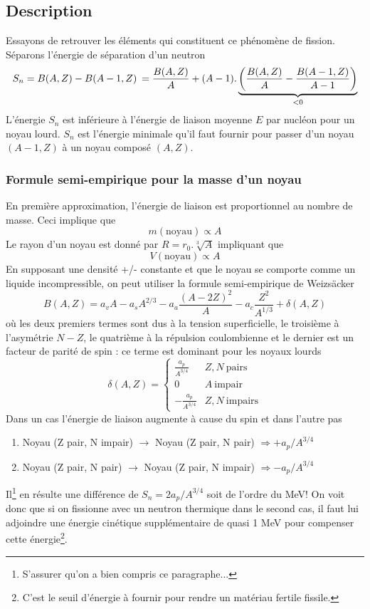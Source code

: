 \subsection{Description}
Essayons de retrouver les éléments qui constituent ce phénomène de fission. Séparons l'énergie de 
séparation d'un neutron
\begin{equation}
{S_n} = B(A,Z) - B(A - 1,Z)  {\kern 1pt} {\kern 1pt}  = \frac{{B(A,Z)}}{A} + (A - 1).
\underbrace{\left( {\frac{{B(A,Z)}}{A} - \frac{{B(A - 1,Z)}}{{A - 1}}} \right)}_{<0}
\end{equation}
L'énergie $S_n$ est inférieure à l'énergie de liaison moyenne $E$ par nucléon pour un noyau lourd.
$S_n$ est l'énergie minimale qu'il faut fournir pour passer d'un noyau $(A-1,Z)$ à un noyau composé $(A,Z)$.

\subsubsection{Formule semi-empirique  pour la masse d'un noyau}
En première approximation, l'énergie de liaison est proportionnel au nombre de masse. Ceci implique 
que 
$$m(\text{noyau}) \propto A$$
Le rayon d'un noyau est donné par $R=r_0.\sqrt[3]{A}$ impliquant que
$$V(\text{noyau}) \propto A$$
En supposant une densité +/- constante et que le noyau se comporte comme un liquide incompressible, 
on peut utiliser la formule semi-empirique de Weizsäcker
\begin{equation}
B(A,Z) = {a_v}A - {a_s}{A^{2/3}} - {a_a}\frac{{{{(A - 2Z)}^2}}}{A} - {a_c}\frac{{{Z^2}}}{{{A^{1/3}}}} + \delta (A,Z)
\end{equation}
où les deux premiers termes sont dus à la tension superficielle, le troisième à l'asymétrie $N-Z$, le quatrième
à la répulsion coulombienne et le dernier est un facteur de parité de spin : ce terme est dominant 
pour les noyaux lourds
\begin{equation}
\delta(A,Z) = \left\{\begin{array}{ll}
\frac{a_p}{A^{3/4}} & Z, N\ \text{pairs}\\
0 & A\ \text{impair}\\
-\frac{a_p}{A^{3/4}} & Z, N\ \text{impairs}
\end{array}\right.
\end{equation}
Dans un cas l'énergie de liaison augmente à cause du spin et dans l'autre pas
\begin{enumerate}
\item Noyau (Z pair, N impair) $\to$ Noyau (Z pair, N pair) $\Rightarrow +a_p/A^{3/4}$
\item Noyau (Z pair, N pair) $\to$ Noyau (Z pair, N impair) $\Rightarrow -a_p/A^{3/4}$
\end{enumerate}
Il\footnote{S'assurer qu'on a bien compris ce paragraphe...}
 en résulte une différence de $S_n = 2a_p/A^{3/4}$ soit de l'ordre du MeV! On voit donc 
que si on fissionne avec un neutron thermique dans le second cas, il faut lui adjoindre une énergie cinétique 
supplémentaire de quasi 1 MeV pour compenser cette énergie\footnote{C'est le seuil d'énergie à fournir 
pour rendre un matériau fertile fissile.}. 



